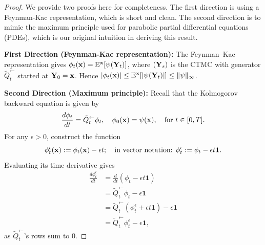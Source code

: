 \documentclass[10pt,a4paper]{amsart}
\newcommand{\E}{\mathbb{E}}
\newcommand{\bfY}{{\bf Y}}
\newcommand{\bfx}{{\bf x}}
\begin{document}
\begin{proof}
We provide two proofs here for completeness. The first direction is using a Feynman-Kac representation, which is short and clean. The second direction is to mimic the maximum principle used for parabolic partial differential equations (PDEs), which is our original intuition in deriving this result.

\textbf{First Direction (Feynman-Kac representation):}
The Feynman--Kac representation gives $\phi_t(\bfx) = \E^\bfx[\psi(\bfY_t)]$, where $(\bfY_s)$ is the CTMC with generator $\tilde{Q}_{t}^{\leftarrow}$ started at $\bfY_0 = \bfx$. Hence $|\phi_t(\bfx)| \le \E^\bfx[|\psi(\bfY_t)|] \le \|\psi\|_\infty$.

\textbf{Second Direction (Maximum principle):} Recall that the Kolmogorov backward equation is given by
    \begin{equation*}
    \frac{d\phi_t}{dt}=\tilde{Q}_{t}^{\leftarrow} \phi_t, \quad \phi_0(\bfx)=\psi(\bfx), \quad \text{for } t \in [0, T].
    \end{equation*}
    For any $\epsilon >0$, construct the function
    \begin{equation*}
        \phi_t^\epsilon(\bfx) := \phi_t(\bfx) - \epsilon t; \quad \text{in vector notation: } \phi_t^\epsilon := \phi_t - \epsilon t\mathbf{1}.
    \end{equation*}
    Evaluating its time derivative gives
    \begin{align}
        \frac{d \phi_t^\epsilon }{dt} &= \frac{d}{dt}(\phi_t - \epsilon t \mathbf{1}) \nonumber \\
        &= \tilde{Q}_{t}^{\leftarrow} \phi_t - \epsilon \mathbf{1} \nonumber \\
        &= \tilde{Q}_{t}^{\leftarrow} \left( \phi^\epsilon_t + \epsilon t \mathbf{1} \right) - \epsilon \mathbf{1} \nonumber \\
        &= \tilde{Q}_{t}^{\leftarrow}  \phi^\epsilon_t  - \epsilon \mathbf{1} ,  \label{eq:d_phi_epsilon} \end{align}
        as $\tilde{Q}_{t}^{\leftarrow}$'s rows sum to 0.
        

\end{proof}
\end{document}
